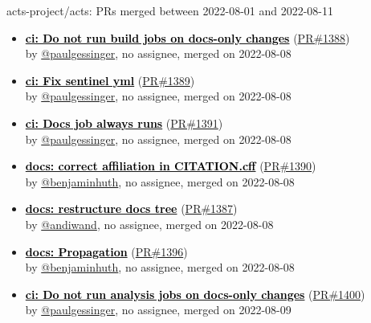 \begin{frame}[allowframebreaks]{ acts-project/acts: PRs merged 
between 2022-08-01 and 2022-08-11
}
\begin{itemize}
    \item
    \prmerged\textbf{\href{https://github.com/acts-project/acts/pull/1388}{\textcolor{black}{ci: Do not run build jobs on docs-only changes}}}
    (\href{https://github.com/acts-project/acts/pull/1388}{PR\#1388}) \\
    by \href{https://github.com/paulgessinger}{@paulgessinger}, {}no assignee, merged on 2022-08-08

    \item
    \prmerged\textbf{\href{https://github.com/acts-project/acts/pull/1389}{\textcolor{black}{ci: Fix sentinel yml}}}
    (\href{https://github.com/acts-project/acts/pull/1389}{PR\#1389}) \\
    by \href{https://github.com/paulgessinger}{@paulgessinger}, {}no assignee, merged on 2022-08-08

    \item
    \prmerged\textbf{\href{https://github.com/acts-project/acts/pull/1391}{\textcolor{black}{ci: Docs job always runs}}}
    (\href{https://github.com/acts-project/acts/pull/1391}{PR\#1391}) \\
    by \href{https://github.com/paulgessinger}{@paulgessinger}, {}no assignee, merged on 2022-08-08

    \item
    \prmerged\textbf{\href{https://github.com/acts-project/acts/pull/1390}{\textcolor{black}{docs: correct affiliation in CITATION.cff}}}
    (\href{https://github.com/acts-project/acts/pull/1390}{PR\#1390}) \\
    by \href{https://github.com/benjaminhuth}{@benjaminhuth}, {}no assignee, merged on 2022-08-08

    \item
    \prmerged\textbf{\href{https://github.com/acts-project/acts/pull/1387}{\textcolor{black}{docs: restructure docs tree}}}
    (\href{https://github.com/acts-project/acts/pull/1387}{PR\#1387}) \\
    by \href{https://github.com/andiwand}{@andiwand}, {}no assignee, merged on 2022-08-08

    \item
    \prmerged\textbf{\href{https://github.com/acts-project/acts/pull/1396}{\textcolor{black}{docs: Propagation}}}
    (\href{https://github.com/acts-project/acts/pull/1396}{PR\#1396}) \\
    by \href{https://github.com/benjaminhuth}{@benjaminhuth}, {}no assignee, merged on 2022-08-08

    \item
    \prmerged\textbf{\href{https://github.com/acts-project/acts/pull/1400}{\textcolor{black}{ci: Do not run analysis jobs on docs-only changes}}}
    (\href{https://github.com/acts-project/acts/pull/1400}{PR\#1400}) \\
    by \href{https://github.com/paulgessinger}{@paulgessinger}, {}no assignee, merged on 2022-08-09


\end{itemize}
\end{frame}
